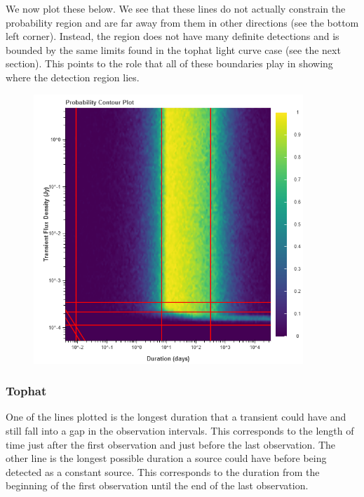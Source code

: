 \documentclass{article}
\begin{document}
We now plot these below. We see that these lines do not actually constrain the probability region and are far away from them in other directions (see the bottom left corner). Instead, the region does not have many definite detections and is bounded by the same limits found in the tophat light curve case (see the next section). This points to the role that all of these boundaries play in showing where the detection region lies.
\begin{figure}[H] 
	\begin{center}
		\includegraphics[width=4in]{output_ered_ProbContour.png}
		
		\label{tophat}
	\end{center}
\end{figure}
\subsubsection{Tophat}
One of the lines plotted is the longest duration that a transient could have and still fall into a gap in the observation intervals. This corresponds to the length of time just after the first observation and just before the last observation. The other line is the longest possible duration a source could have before being detected as a constant source. This corresponds to the duration from the beginning of the first observation until the end of the last observation.
\end{document}
